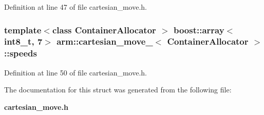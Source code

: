 \-Definition at line 47 of file cartesian\-\_\-move.\-h.

\subsubsection[{speeds}]{\setlength{\rightskip}{0pt plus 5cm}template$<$class Container\-Allocator $>$ boost\-::array$<$int8\-\_\-t, 7$>$ {\bf arm\-::cartesian\-\_\-move\-\_\-}$<$ \-Container\-Allocator $>$\-::{\bf speeds}}\label{structarm_1_1cartesian__move___a47d2dfde36305c50d75d218fc275d9f0}


\-Definition at line 50 of file cartesian\-\_\-move.\-h.



\-The documentation for this struct was generated from the following file\-:\begin{DoxyCompactItemize}
\item 
{\bf cartesian\-\_\-move.\-h}\end{DoxyCompactItemize}
